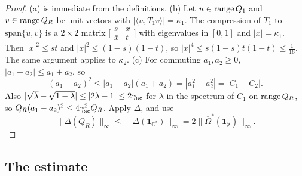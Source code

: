 \begin{proof}
(a) is immediate from the definitions. (b) Let $u\in\operatorname{range} Q_1$ and $v\in\operatorname{range} Q_R$ be unit vectors with $|\langle u,T_1v\rangle|=\kappa_1$. The compression of $T_1$ to $\mathrm{span}\{u,v\}$ is a $2\times2$ matrix $\big[\begin{smallmatrix}s&x\\\bar x&t\end{smallmatrix}\big]$ with eigenvalues in $[0,1]$ and $|x|=\kappa_1$. Then $|x|^2\leq st$ and $|x|^2\leq(1-s)(1-t)$, so $|x|^4\leq s(1-s)t(1-t)\leq\frac1{16}$. The same argument applies to $\kappa_2$. (c) For commuting $a_1,a_2\geq0$, $|a_1-a_2|\leq a_1+a_2$, so
\[
(a_1-a_2)^2\leq|a_1-a_2|(a_1+a_2)=|a_1^2-a_2^2|=|C_1-C_2|.
\]
Also $|\sqrt\lambda-\sqrt{1-\lambda}|\leq|2\lambda-1|\leq2\gamma_{\rm ac}$ for $\lambda$ in the spectrum of $C_1$ on $\operatorname{range} Q_R$, so $Q_R(a_1-a_2)^2\leq4\gamma_{\rm ac}^2Q_R$. Apply $\Delta$, and use
\[
\|\Delta(Q_R)\|_\infty\leq\|\Delta(\mathbf{1}_{\mathbb{C}^r})\|_\infty=2\|\overline{\Omega}^*(\mathbf{1}_{\mathcal{Y}})\|_\infty.
\]
\end{proof}

\subsection{The estimate}

